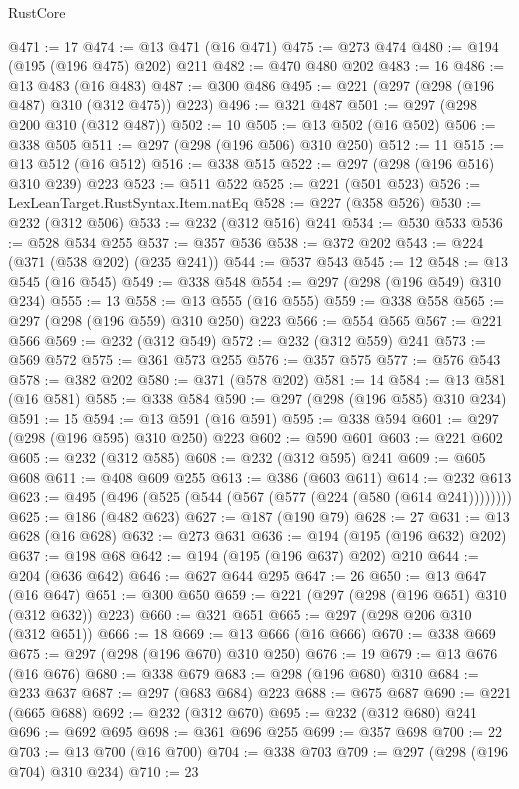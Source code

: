 \begin{lexlean}{RustCore}
\begin{coremodule}
{\begin{coremodule}
{{{{{{{{@471 := 17
@474 := @13 @471 (@16 @471)
@475 := @273 @474
@480 := @194 (@195 (@196 @475) @202) @211
@482 := @470 @480 @202
@483 := 16
@486 := @13 @483 (@16 @483)
@487 := @300 @486
@495 := @221 (@297 (@298 (@196 @487) @310 (@312 @475)) @223)
@496 := @321 @487
@501 := @297 (@298 @200 @310 (@312 @487))
@502 := 10
@505 := @13 @502 (@16 @502)
@506 := @338 @505
@511 := @297 (@298 (@196 @506) @310 @250)
@512 := 11
@515 := @13 @512 (@16 @512)
@516 := @338 @515
@522 := @297 (@298 (@196 @516) @310 @239) @223
@523 := @511 @522
@525 := @221 (@501 @523)
@526 := LexLeanTarget.RustSyntax.Item.natEq
@528 := @227 (@358 @526)
@530 := @232 (@312 @506)
@533 := @232 (@312 @516) @241
@534 := @530 @533
@536 := @528 @534 @255
@537 := @357 @536
@538 := @372 @202
@543 := @224 (@371 (@538 @202) (@235 @241))
@544 := @537 @543
@545 := 12
@548 := @13 @545 (@16 @545)
@549 := @338 @548
@554 := @297 (@298 (@196 @549) @310 @234)
@555 := 13
@558 := @13 @555 (@16 @555)
@559 := @338 @558
@565 := @297 (@298 (@196 @559) @310 @250) @223
@566 := @554 @565
@567 := @221 @566
@569 := @232 (@312 @549)
@572 := @232 (@312 @559) @241
@573 := @569 @572
@575 := @361 @573 @255
@576 := @357 @575
@577 := @576 @543
@578 := @382 @202
@580 := @371 (@578 @202)
@581 := 14
@584 := @13 @581 (@16 @581)
@585 := @338 @584
@590 := @297 (@298 (@196 @585) @310 @234)
@591 := 15
@594 := @13 @591 (@16 @591)
@595 := @338 @594
@601 := @297 (@298 (@196 @595) @310 @250) @223
@602 := @590 @601
@603 := @221 @602
@605 := @232 (@312 @585)
@608 := @232 (@312 @595) @241
@609 := @605 @608
@611 := @408 @609 @255
@613 := @386 (@603 @611)
@614 := @232 @613
@623 := @495 (@496 (@525 (@544 (@567 (@577 (@224 (@580 (@614 @241))))))))
@625 := @186 (@482 @623)
@627 := @187 (@190 @79)
@628 := 27
@631 := @13 @628 (@16 @628)
@632 := @273 @631
@636 := @194 (@195 (@196 @632) @202)
@637 := @198 @68
@642 := @194 (@195 (@196 @637) @202) @210
@644 := @204 (@636 @642)
@646 := @627 @644 @295
@647 := 26
@650 := @13 @647 (@16 @647)
@651 := @300 @650
@659 := @221 (@297 (@298 (@196 @651) @310 (@312 @632)) @223)
@660 := @321 @651
@665 := @297 (@298 @206 @310 (@312 @651))
@666 := 18
@669 := @13 @666 (@16 @666)
@670 := @338 @669
@675 := @297 (@298 (@196 @670) @310 @250)
@676 := 19
@679 := @13 @676 (@16 @676)
@680 := @338 @679
@683 := @298 (@196 @680) @310
@684 := @233 @637
@687 := @297 (@683 @684) @223
@688 := @675 @687
@690 := @221 (@665 @688)
@692 := @232 (@312 @670)
@695 := @232 (@312 @680) @241
@696 := @692 @695
@698 := @361 @696 @255
@699 := @357 @698
@700 := 22
@703 := @13 @700 (@16 @700)
@704 := @338 @703
@709 := @297 (@298 (@196 @704) @310 @234)
@710 := 23
}}}}}}}}
\end{coremodule}}
\end{coremodule}
\end{lexlean}
